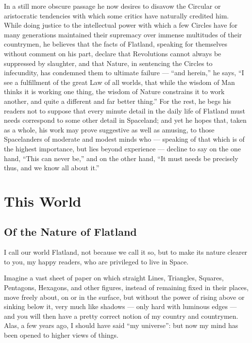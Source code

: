 \documentclass[12pt, a4paper, twoside]{memoir}
\begin{document}
In a still more obscure passage he now desires to disavow the Circular or
aristocratic tendencies with which some critics have naturally credited him.
While doing justice to the intellectual power with which a few Circles have
for many generations maintained their supremacy over immense multitudes of
their countrymen, he believes that the facts of Flatland, speaking for
themselves without comment on his part, declare that Revolutions cannot always
be suppressed by slaughter, and that Nature, in sentencing the Circles to
infecundity, has condemned them to ultimate failure --- ``and herein,'' he says,
``I see a fulfillment of the great Law of all worlds, that while the wisdom of
Man thinks it is working one thing, the wisdom of Nature constrains it to work
another, and quite a different and far better thing.'' For the rest, he begs
his readers not to suppose that every minute detail in the daily life of
Flatland must needs correspond to some other detail in Spaceland; and yet he
hopes that, taken as a whole, his work may prove suggestive as well as
amusing, to those Spacelanders of moderate and modest minds who --- speaking of
that which is of the highest importance, but lies beyond experience --- decline
to say on the one hand, ``This can never be,'' and on the other hand, ``It must
needs be precisely thus, and we know all about it.''



\mainmatter

\part{This World}
\chapter{Of the Nature of Flatland} I call our world Flatland, not because we
call it so, but to make its nature clearer to you, my happy readers, who are
privileged to live in Space.

Imagine a vast sheet of paper on which straight Lines, Triangles, Squares,
Pentagons, Hexagons, and other figures, instead of remaining fixed in their
places, move freely about, on or in the surface, but without the power of
rising above or sinking below it, very much like shadows --- only hard with
luminous edges --- and you will then have a pretty correct notion of my country
and countrymen. Alas, a few years ago, I should have said ``my universe'': but
now my mind has been opened to higher views of things.
\end{document}
